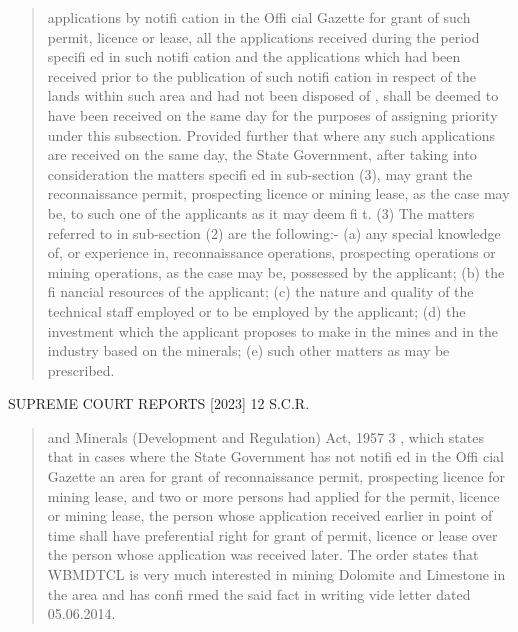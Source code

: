 \documentclass[12pt,a4paper]{article}
\newenvironment{judgequote}
  {\begin{quote}\small}
  {\end{quote}}
\begin{document}
\begin{judgequote}
applications by notifi cation in the Offi cial Gazette for grant of such permit, licence or
lease, all the applications received during the period specifi ed in such notifi cation and the
applications which had been received prior to the publication of such notifi cation in respect
of the lands within such area and had not been disposed of , shall be deemed to have been
received on the same day for the purposes of assigning priority under this subsection.
Provided further that where any such applications are received on the same day, the State
Government, after taking into consideration the matters specifi ed in sub-section (3), may
grant the reconnaissance permit, prospecting licence or mining lease, as the case may be, to
such one of the applicants as it may deem fi t.
(3) The matters referred to in sub-section (2) are the following:-
(a) any special knowledge of, or experience in, reconnaissance operations, prospecting
operations or mining operations, as the case may be, possessed by the applicant;
(b) the fi nancial resources of the applicant;
(c) the nature and quality of the technical staff employed or to be employed by the applicant;
(d) the investment which the applicant proposes to make in the mines and in the industry
based on the minerals;
(e) such other matters as may be prescribed.
\end{judgequote}



 SUPREME COURT REPORTS [2023] 12 S.C.R.


\begin{judgequote}
and Minerals (Development and Regulation) Act, 1957 3 , which states that
in cases where the State Government has not notifi ed in the Offi cial Gazette
an area for grant of reconnaissance permit, prospecting licence for mining
lease, and two or more persons had applied for the permit, licence or mining
lease, the person whose application received earlier in point of time shall
have preferential right for grant of permit, licence or lease over the person
whose application was received later. The order states that WBMDTCL is
very much interested in mining Dolomite and Limestone in the area and has
confi rmed the said fact in writing vide letter dated 05.06.2014.
\end{judgequote}
\end{document}
